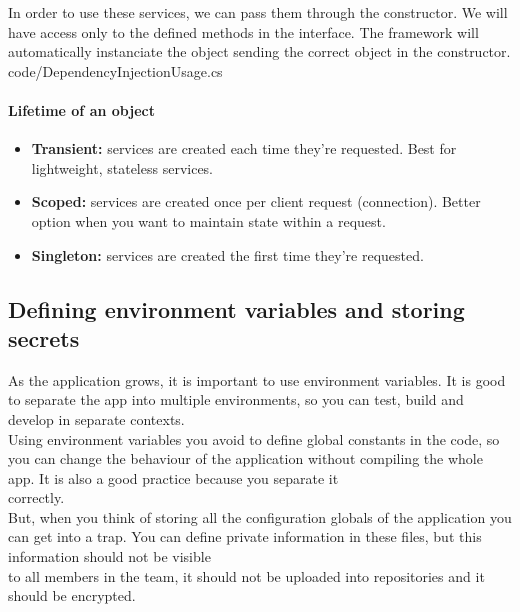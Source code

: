         In order to use these services, we can pass them through the constructor. We will have access only to the defined methods in the interface. The framework will automatically instanciate the object sending the correct object in the constructor. \\
        
        {code/DependencyInjectionUsage.cs}
    

            \paragraph{Lifetime of an object}
            \begin{itemize}[noitemsep]
                \item \textbf{Transient:} services are created each time they're requested. Best for lightweight, stateless services.
                \item \textbf{Scoped:} services are created once per client request (connection). Better option when you want to maintain state within a request.
                \item \textbf{Singleton:} services are created the first time they're requested.
            \end{itemize}

    \subsection{Defining environment variables and storing secrets}
    As the application grows, it is important to use environment variables. It is good to separate the app into multiple environments, so you can test, build and develop in separate contexts. \\
    Using environment variables you avoid to define global constants in the code, so you can change the behaviour of the application without compiling the whole app. It is also a good practice because you separate it \\
    correctly. \\
    
    But, when you think of storing all the configuration globals of the application you can get into a trap. You can define private information in these files, but this information should not be visible \\
    to all members in the team, it should not be uploaded into repositories and it should be encrypted. \\

